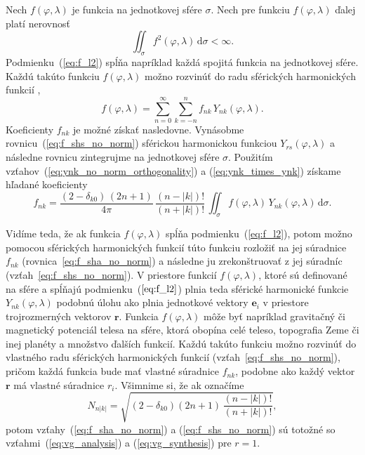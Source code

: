 \documentclass[a4paper, 12pt]{book}
\newcommand{\diff}{\mathrm d}
\let\vec\mathbf
\begin{document}
Nech $f(\varphi, \lambda)$ je funkcia na jednotkovej sfére $\sigma$.  Nech pre 
funkciu $f(\varphi, \lambda)$ ďalej platí nerovnosť
%
\begin{equation}
\label{eq:f_l2}
\iint_\sigma f^2(\varphi, \lambda) \, \diff \sigma < \infty{.}
\end{equation}
%
Podmienku~(\ref{eq:f_l2}) spĺňa napríklad každá spojitá funkcia na jednotkovej 
sfére.  Každú takúto funkciu $f(\varphi, \lambda)$ možno rozvinúť do radu 
sférických harmonických funkcií \citep[napríklad][]{MoritzPhysicalGeodesy},
%
\begin{equation}
\label{eq:f_shs_no_norm}
f(\varphi, \lambda) = \sum_{n = 0}^\infty \sum_{k = -n}^n f_{nk} \, 
Y_{nk}(\varphi, \lambda){.}
\end{equation}
%
Koeficienty $f_{nk}$ je možné získať nasledovne.  Vynásobme 
rovnicu~(\ref{eq:f_shs_no_norm}) sférickou harmonickou funkciou $Y_{rs}(\varphi, 
\lambda)$ a následne rovnicu zintegrujme na jednotkovej sfére $\sigma$.  
Použitím vzťahov~(\ref{eq:ynk_no_norm_orthogonality}) 
a (\ref{eq:ynk_times_ynk}) získame hľadané koeficienty
%
\begin{equation}
\label{eq:f_sha_no_norm}
f_{nk} = \frac{(2 - \delta_{k0}) \, (2n + 1)}{4\pi} \, \frac{(n - |k|)!}{(n 
+ |k|)!} \, \iint_{\sigma} f(\varphi, \lambda) \, Y_{nk}(\varphi, \lambda) \, 
\diff \sigma{.}
\end{equation}
%

Vidíme teda, že ak funkcia $f(\varphi, \lambda)$ spĺňa 
podmienku~(\ref{eq:f_l2}), potom možno pomocou sférických harmonických funkcií 
túto funkciu rozložiť na jej súradnice $f_{nk}$ 
(rovnica~\ref{eq:f_sha_no_norm}) a následne ju zrekonštruovať z jej súradníc 
(vzťah~\ref{eq:f_shs_no_norm}).  V priestore funkcií $f(\varphi, \lambda)$, 
ktoré sú definované na sfére a spĺňajú podmienku~($\ref{eq:f_l2}$) plnia teda 
sférické harmonické funkcie $Y_{nk}(\varphi, \lambda)$ podobnú úlohu ako plnia 
jednotkové vektory $\vec e_i$ v priestore trojrozmerných vektorov $\vec r$.  
Funkcia $f(\varphi,\lambda)$ môže byť napríklad gravitačný či magnetický 
potenciál telesa na sfére, ktorá obopína celé teleso, topografia Zeme či inej 
planéty a množstvo ďalších funkcií.  Každú takúto funkciu možno rozvinúť do 
vlastného radu sférických harmonických funkcií (vzťah~\ref{eq:f_shs_no_norm}), 
pričom každá funkcia bude mať vlastné súradnice $f_{nk}$, podobne ako každý 
vektor $\vec r$ má vlastné súradnice $r_i$.  Všimnime si, že ak označíme
%
\begin{equation}
\label{eq:sh_norm}
N_{n|k|} = \sqrt{(2 - \delta_{k0}) (2n + 1) \, \frac{(n - |k|)!}{(n 
+ |k|)!}}{,}
\end{equation}
%
potom vzťahy~(\ref{eq:f_sha_no_norm}) a (\ref{eq:f_shs_no_norm}) sú totožné so 
vzťahmi~(\ref{eq:vg_analysis}) a (\ref{eq:vg_synthesis}) pre $r = 1$.
\end{document}
